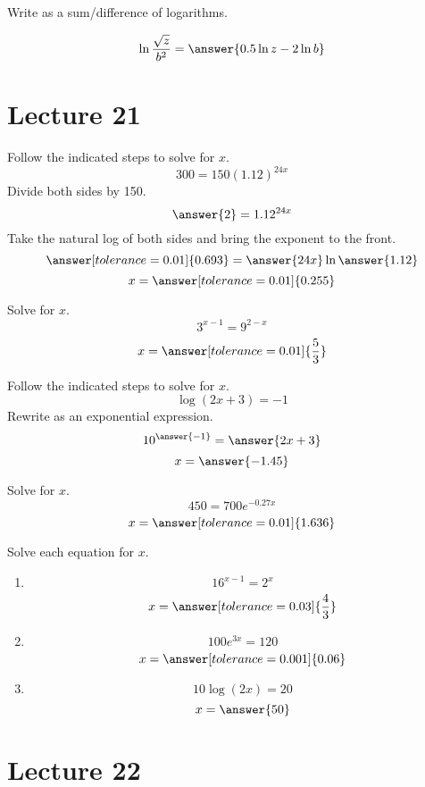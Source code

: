 \documentclass{ximera}
\begin{document}
 \begin{problem}\label{prob:160hom8prob11}
 Write as a sum/difference of logarithms.
 
 $$\ln \frac{\sqrt{z}}{b^2}=\answer{0.5\ln z-2\ln b}$$
 \end{problem}

 
 
  \section{Lecture 21}
 
 \begin{problem}\label{prob:160hom8prob4}
Follow the indicated steps to solve for $x$.
$$300=150(1.12)^{24x}$$
Divide both sides by 150.
$$\answer{2}=1.12^{24x}$$
Take the natural log of both sides and bring the exponent to the front.
$$\answer[tolerance=0.01]{0.693}=\answer{24x}\ln\answer{1.12}$$
$$x=\answer[tolerance=0.01]{0.255}$$
\end{problem}

\begin{problem}\label{prob:160hom8prob5}
Solve for $x$.
$$3^{x-1}=9^{2-x}$$
$$x=\answer[tolerance=0.01]{\frac{5}{3}}$$
\end{problem}

\begin{problem}\label{prob:160hom8prob6}
Follow the indicated steps to solve for $x$.
$$\log (2x+3)=-1$$
Rewrite as an exponential expression.
$$10^{\answer{-1}}=\answer{2x+3}$$
$$x=\answer{-1.45}$$
\end{problem}

\begin{problem}\label{prob:160hom8prob7}
Solve for $x$.
$$450=700e^{-0.27x}$$
$$x=\answer[tolerance=0.01]{1.636}$$
\end{problem}

\begin{problem}\label{prob:160hom8prob9}
 Solve each equation for $x$.
 \begin{enumerate}
     \item $$16^{x-1}=2^x$$
     $$x=\answer[tolerance=0.03]{\frac{4}{3}}$$
     \item 
     $$100e^{3x}=120$$
     $$x=\answer[tolerance=0.001]{0.06}$$
     \item 
     $$10\log (2x)=20$$
     $$x=\answer{50}$$
 \end{enumerate}
 \end{problem}
 
 \section{Lecture 22}
 
\end{document}
